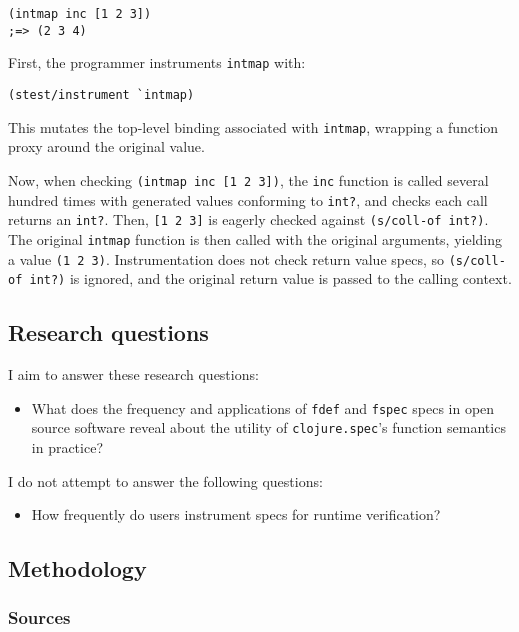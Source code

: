 \begin{verbatim}
(intmap inc [1 2 3])
;=> (2 3 4)
\end{verbatim}

First, the programmer instruments \texttt{intmap} with:

\begin{verbatim}
(stest/instrument `intmap)
\end{verbatim}

This mutates the top-level binding associated with \texttt{intmap}, wrapping a function
proxy around the original value.

Now, when checking \texttt{(intmap inc [1 2 3])}, the \texttt{inc} function is
called several hundred times with generated values conforming to \texttt{int?},
and checks each call returns an \texttt{int?}.
Then, \texttt{[1 2 3]} is eagerly checked against \texttt{(s/coll-of int?)}.
The original \texttt{intmap} function is then called with the original arguments,
yielding a value \texttt{(1 2 3)}. Instrumentation does not check return value specs,
so \texttt{(s/coll-of int?)} is ignored, and the original return value is passed to the calling
context.

\subsection{Research questions}

I aim to answer these research questions:

\begin{itemize}
  \item What does the frequency and applications of \texttt{fdef} and \texttt{fspec} specs
    in open source software reveal about the utility of \texttt{clojure.spec}'s
    function semantics in practice?
\end{itemize}

I do not attempt to answer the following questions:

\begin{itemize}
  \item How frequently do users instrument specs for runtime verification?
\end{itemize}

\subsection{Methodology}

\subsubsection{Sources}

